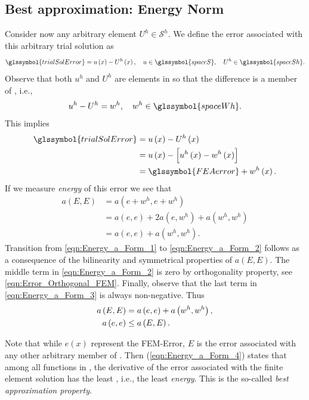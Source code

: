 \subsection{Best approximation: Energy Norm}	\label{cha:Energy_Norm}
Consider now any arbitrary element $U^h \in \mathcal{S}^h$. We define the error associated with this arbitrary trial solution as
\begin{equation}	\label{eqn:Trial_Sol_Error}
	\glssymbol{trialSolError} = u \left( x \right) - U^h \left( x \right),
		\quad  u \in \glssymbol{spaceS}, \quad	U^h \in \glssymbol{spaceSh}.
\end{equation}
Observe that both $u^h$ and $U^h$ are elements in  so that the difference is a member of , i.e., 
\begin{equation}
	u^h - U^h = w^h, \quad w^h \in \glssymbol{spaceWh}.
\end{equation}
This implies 
\begin{equation}
	\begin{aligned}
		\glssymbol{trialSolError} &= u \left( x \right) - U^h \left( x \right)	\\
		&= u \left( x \right) - \Bigl[ u^h \left( x \right) - w^h \left( x \right) \Bigr]	\\
		&= \glssymbol{FEAerror} + w^h \left( x \right).
	\end{aligned}
\end{equation}
If we measure \textsl{energy} of this error we see that
	\begin{align}
		a \left( E, E \right) &= a \left( e + w^h, e + w^h \right)	\label{eqn:Energy_a_Form_1} \\
		&= a \left( e, e \right) + 2 a \left( e, w^h \right) + a \left( w^h, w^h \right)	\label{eqn:Energy_a_Form_2} \\
		&= a \left( e, e \right) + a \left( w^h, w^h \right).	\label{eqn:Energy_a_Form_3} 
	\end{align}
Transition from \cref{eqn:Energy_a_Form_1} to \cref{eqn:Energy_a_Form_2} follows as a consequence of the bilinearity and
symmetrical properties of $a \left( E, E \right)$. The middle term in \cref{eqn:Energy_a_Form_2} is zero by orthogonality property,
see \cref{eqn:Error_Orthogonal_FEM}. Finally, observe that the last term in \cref{eqn:Energy_a_Form_3} is always non-negative.
Thus
	\begin{align}
		a \left( E, E \right) &= a \left( e, e \right) + a \left( w^h, w^h \right),	\notag	\\
		a \left( e, e \right) &\leq a \left( E, E \right).	\label{eqn:Energy_a_Form_4} 
	\end{align}
\begin{remark}
	Note that while $e \left( x \right)$ represent the FEM-Error, $E$ is the error associated with any other arbitrary member of
	. Then (\ref{eqn:Energy_a_Form_4}) states that among all functions in , the derivative
	of the error associated with the finite element solution has the least , i.e., the least \emph{energy}. This is the so-called
	\emph{best approximation property}.
\end{remark}

